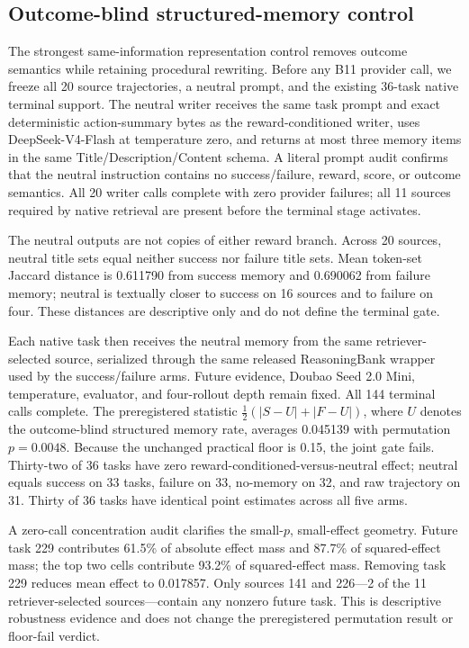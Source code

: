 \subsection{Outcome-blind structured-memory control}
The strongest same-information representation control removes outcome semantics while retaining procedural rewriting. Before any B11 provider call, we freeze all 20 source trajectories, a neutral prompt, and the existing 36-task native terminal support. The neutral writer receives the same task prompt and exact deterministic action-summary bytes as the reward-conditioned writer, uses DeepSeek-V4-Flash at temperature zero, and returns at most three memory items in the same Title/Description/Content schema. A literal prompt audit confirms that the neutral instruction contains no success/failure, reward, score, or outcome semantics. All 20 writer calls complete with zero provider failures; all 11 sources required by native retrieval are present before the terminal stage activates.

The neutral outputs are not copies of either reward branch. Across 20 sources, neutral title sets equal neither success nor failure title sets. Mean token-set Jaccard distance is 0.611790 from success memory and 0.690062 from failure memory; neutral is textually closer to success on 16 sources and to failure on four. These distances are descriptive only and do not define the terminal gate.

Each native task then receives the neutral memory from the same retriever-selected source, serialized through the same released ReasoningBank wrapper used by the success/failure arms. Future evidence, Doubao Seed 2.0 Mini, temperature, evaluator, and four-rollout depth remain fixed. All 144 terminal calls complete. The preregistered statistic $\frac12(|S-U|+|F-U|)$, where $U$ denotes the outcome-blind structured memory rate, averages 0.045139 with permutation $p=0.0048$. Because the unchanged practical floor is 0.15, the joint gate fails. Thirty-two of 36 tasks have zero reward-conditioned-versus-neutral effect; neutral equals success on 33 tasks, failure on 33, no-memory on 32, and raw trajectory on 31. Thirty of 36 tasks have identical point estimates across all five arms.

A zero-call concentration audit clarifies the small-$p$, small-effect geometry. Future task 229 contributes 61.5\% of absolute effect mass and 87.7\% of squared-effect mass; the top two cells contribute 93.2\% of squared-effect mass. Removing task 229 reduces mean effect to 0.017857. Only sources 141 and 226---2 of the 11 retriever-selected sources---contain any nonzero future task. This is descriptive robustness evidence and does not change the preregistered permutation result or floor-fail verdict.

